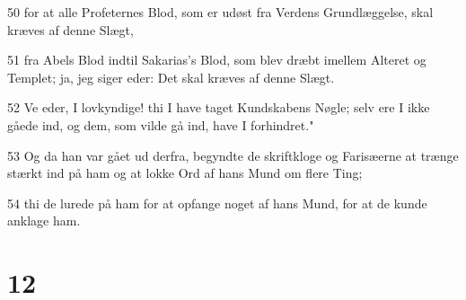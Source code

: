 \par 50 for at alle Profeternes Blod, som er udøst fra Verdens Grundlæggelse, skal kræves af denne Slægt,
\par 51 fra Abels Blod indtil Sakarias's Blod, som blev dræbt imellem Alteret og Templet; ja, jeg siger eder: Det skal kræves af denne Slægt.
\par 52 Ve eder, I lovkyndige! thi I have taget Kundskabens Nøgle; selv ere I ikke gåede ind, og dem, som vilde gå ind, have I forhindret."
\par 53 Og da han var gået ud derfra, begyndte de skriftkloge og Farisæerne at trænge stærkt ind på ham og at lokke Ord af hans Mund om flere Ting;
\par 54 thi de lurede på ham for at opfange noget af hans Mund, for at de kunde anklage ham.

\chapter{12}

